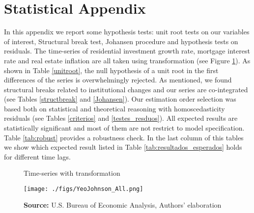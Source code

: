 \documentclass[12pt, a4paper]{article}
\begin{document}
\appendix
\section{Statistical Appendix}
\label{sec:orgf2d042c}
\label{appen:A}

In this appendix we report some hypothesis tests: unit root tests on our variables of interest, Structural break test, Johansen procedure and hypothesis tests on residuals.
The time-series of residential investment growth rate, mortgage interest rate and real estate inflation are all taken using \textcite{yeo_new_2000} transformation (see Figure \ref{YeoJhonson}).
As shown in Table \ref{unitroot}, the null hypothesis of a unit root in the first differences of the series is overwhelmingly rejected.
As mentioned, we found structural breaks related to institutional changes and our series are co-integrated (see Tables \ref{structbreak} and \ref{Johansen}).
Our estimation order selection was based both on statistical and theoretical reasoning with homoscedasticity residuals (see Tables \ref{criterios} and \ref{testes_resduos}).
All expected results are statistically significant and most of them are not restrict to model specification.
Table \ref{tab:robust} provides a robustness check.
In the last column of this tables we show which expected result listed in Table \ref{tab:resultados_esperados} holds for different time lags.

\begin{figure}[htb]
	\centering
	\caption{Time-series with \textcite{yeo_new_2000} transformation}
	\label{YeoJhonson}
	\texttt{[image: ./figs/YeoJohnson\_All.png]}
	\caption*{\textbf{Source:} U.S. Bureau of Economic Analysis, Authors' elaboration}
\end{figure}






\end{document}
